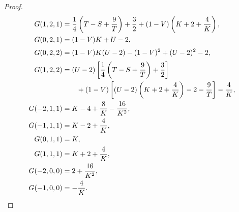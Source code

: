 \documentclass{amsart}
\theoremstyle{definition}
\begin{document}
\begin{proof}
\begin{align}
G(1,2,1)&=\frac14\left(T-S+\frac9T\right)+\frac32+(1-V)\left(K+2+\frac4K\right),\notag
\\
G(0,2,1)&=(1-V)K+U-2,\notag
\\[2pt]
G(0,2,2)&=(1-V)K(U-2)-(1-V)^{2}+(U-2)^{2}-2,\notag
\\[2pt]
G(1,2,2)&=(U-2)\left[\frac14\left(T-S+\frac9T\right)+\frac32\right]\notag\\
&\qquad{}+(1-V)\left[(U-2)\left(K+2+\frac4K\right)-2-\frac9T\right]-\frac4K,\notag
\\
G(-2,1,1)&=K-4+\frac8K-\frac{16}{K^{2}},\notag\\
G(-1,1,1)&=K-2+\frac4K,\notag
\\
G(0,1,1)&=K,\notag\\
G(1,1,1)&=K+2+\frac4K,\notag
\\
G(-2,0,0)&=2+\frac{16}{K^{2}},\notag\\
G(-1,0,0)&=-\frac4K.\notag
\end{align}



\end{proof}
\end{document}
